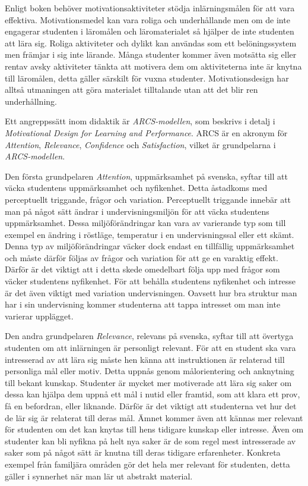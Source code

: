 \documentclass[12pt,a4paper,twoside,openright]{article}
\begin{document}
Enligt boken%
behöver motivations\-aktiviteter stödja inlärningsmålen för att vara
effektiva. Motivationsmedel kan vara roliga och underhållande men om
de inte engagerar studenten i läromålen och läromaterialet så hjälper
de inte studenten att lära sig. Roliga aktiviteter och dylikt kan
användas som ett belöningssystem men främjar i sig inte lärande. Många
studenter kommer även motsätta sig eller rentav avsky aktiviteter
tänkta att motivera dem om aktiviteterna inte är knytna till
läromålen, detta gäller särskilt för vuxna studenter.
Motivationsdesign har alltså utmaningen att göra materialet
tilltalande utan att det blir ren underhållning.

Ett angreppssätt inom didaktik är \textit{ARCS-modellen}, som beskrivs
i detalj i \textit{Motivational Design for Learning and Performance}.
ARCS är en akronym för \textit{Attention}, \textit{Relevance},
\textit{Confidence} och \textit{Satisfaction}, vilket är grundpelarna
i \textit{ARCS-modellen}.

Den första grundpelaren \textit{Attention}, uppmärksamhet på svenska,
syftar till att väcka studentens uppmärksamhet och nyfikenhet.
Detta åstadkoms med perceptuellt triggande, frågor och variation.
Perceptuellt triggande innebär att man på något sätt ändrar i
undervisningsmiljön för att väcka studentens uppmärksamhet. Dessa
miljöförändringar kan vara av varierande typ som till exempel en
ändring i röstläge, temperatur i en undervisningssal eller ett skämt.
Denna typ av miljöförändringar väcker dock endast en tillfällig
uppmärksamhet och måste därför följas av frågor och variation för att
ge en varaktig effekt. Därför är det viktigt att i detta skede
omedelbart följa upp med frågor som väcker studentens nyfikenhet. För
att behålla studentens nyfikenhet och intresse är det även viktigt med variation
undervisningen. Oavsett hur bra struktur man har i sin undervisning
kommer studenterna att tappa intresset om man inte varierar upplägget.

Den andra grundpelaren \textit{Relevance}, relevans på svenska, syftar
till att övertyga studenten om att inlärningen är personligt relevant.
För att en student ska vara intresserad av att lära sig måste hen
känna att instruktionen är relaterad till personliga mål eller motiv.
Detta uppnås genom målorientering och anknytning till bekant kunskap.
Studenter är mycket mer motiverade att lära sig saker om dessa kan
hjälpa dem uppnå ett mål i nutid eller framtid, som att klara ett
prov, få en befordran, eller liknande. Därför är det viktigt att
studenterna vet hur det de lär sig är relaterat till deras mål. Ämnet
kommer även att kännas mer relevant för studenten om det kan knytas
till hens tidigare kunskap eller intresse. Även om studenter kan bli
nyfikna på helt nya saker är de som regel mest intresserade av saker
som på något sätt är knutna till deras tidigare erfarenheter.
Konkreta exempel från familjära områden gör det hela mer relevant för
studenten, detta gäller i synnerhet när man lär ut abstrakt material.
\end{document}
